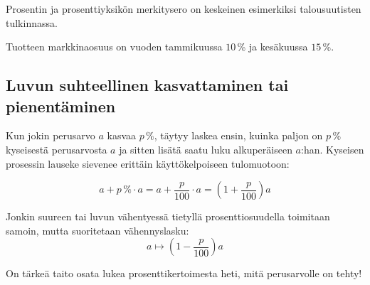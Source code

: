 Prosentin ja prosenttiyksikön merkitysero on keskeinen esimerkiksi talousuutisten tulkinnassa.

\begin{esimerkki}
    Tuotteen markkinaosuus on vuoden tammikuussa $10$\,\% ja kesäkuussa $15$\,\%.

    \begin{esimratk}
    \end{esimratk}
	\begin{esimvast}
	\end{esimvast}
\end{esimerkki}


\subsection{Luvun suhteellinen kasvattaminen tai pienentäminen}

Kun jokin perusarvo $a$ kasvaa $p\,\%$, täytyy laskea ensin, kuinka paljon on $p\,\%$ kyseisestä perusarvosta $a$ ja sitten lisätä saatu luku alkuperäiseen $a$:han. Kyseisen prosessin lauseke sievenee erittäin käyttökelpoiseen tulomuotoon:

$$a+ p\,\% \cdot a=a+ \frac{p}{100} \cdot a = (1+\frac{p}{100})a $$

Jonkin suureen tai luvun vähentyessä tietyllä prosenttiosuudella toimitaan samoin, mutta suoritetaan vähennyslasku:
$$a \mapsto (1-\frac{p}{100})a$$

On tärkeä taito osata lukea prosenttikertoimesta heti, mitä perusarvolle on tehty!


